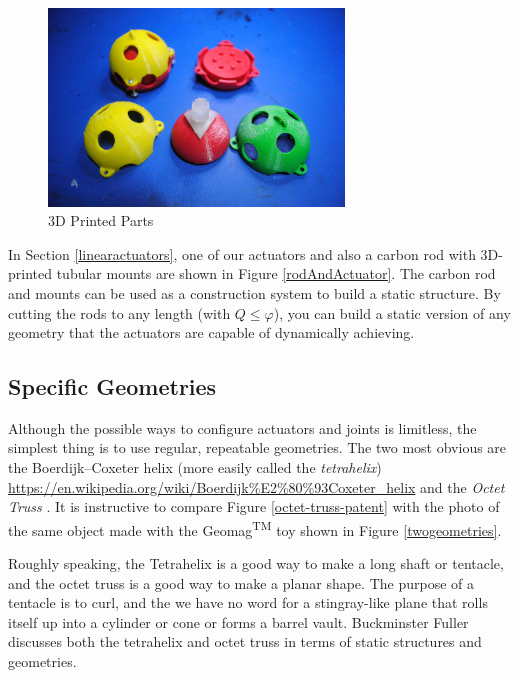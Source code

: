 \documentclass[11pt]{article}
\begin{document}
\begin{figure}[!ht]
  \centering
    \includegraphics[width=0.7\textwidth]{figureslowres/Parts.jpg}
    \caption[3D Printed Parts]{3D Printed Parts}
      \label{parts}
\end{figure}

In Section \ref{linearactuators}, one of our actuators and also a carbon rod with 3D-printed tubular mounts
are shown in Figure \ref{rodAndActuator}.
The carbon rod and mounts can be used as a construction system to build a static structure.
By cutting the rods to any length (with $Q \leq \varphi$), you can build a static version of any geometry that
the actuators
are capable of dynamically achieving.

\subsection{Specific Geometries}

Although the possible ways to configure actuators and joints is limitless, the simplest thing is to
use regular, repeatable geometries. The two most obvious are the Boerdijk--Coxeter helix
(more easily called the \textit{tetrahelix})
\url{https://en.wikipedia.org/wiki/Boerdijk%E2%80%93Coxeter_helix}
  and the \emph{Octet Truss}
  \cite{richard1961synergetic}.
  It is instructive to compare Figure \ref{octet-truss-patent} with the photo of the same object
  made with the Geomag\textsuperscript{TM} toy shown in Figure \ref{twogeometries}.
    
Roughly speaking, the Tetrahelix is a good way to make a long shaft or tentacle, and the octet truss
is a good way to make a planar shape. The purpose of a tentacle is to curl, and the we have no word for
a stingray-like plane that rolls
itself up into a cylinder or cone or forms a barrel vault. Buckminster Fuller discusses
both the tetrahelix and octet truss \cite{fuller1982synergetics} in terms of static structures and geometries.
\end{document}
